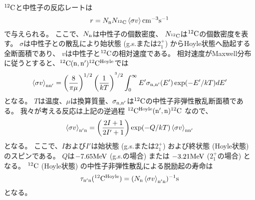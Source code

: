 \documentclass[../master]{subfiles}
\begin{document}
${}^{12}{\rm C}$と中性子の反応レートは
\begin{equation}
  r = N_{\rm n}N_{{}^{12}{\rm C}}\braket{\sigma v} {\rm cm}^{-3}{\rm s}^{-1}
  \label{eq::r}
\end{equation}
で与えられる。
ここで、$N_{{\rm n}}$は中性子の個数密度、
$N_{{}^{12}{\rm C}}$は${}^{12}{\rm C}$の個数密度を表す。
$\sigma$は中性子との散乱により始状態 (g.s.または$2_{1}^{+}$) からHoyle状態へ励起する全断面積であり、
$v$は中性子と${}^{12}{\rm C}$の相対速度である。
相対速度がMaxwell分布に従うとすると、${}^{12}{\rm C}({\rm n},{\rm n'}){}^{12}{\rm C}^{{\rm Hoyle}}$では
\begin{equation}
  \braket{\sigma v}_{\rm nn'} =
  \left(\frac{8}{\pi\mu}\right)^{1/2}\left(\frac{1}{kT}\right)^{^3/2}
  \int^{\infty}_{0}E'\sigma_{\rm n,n'}(E')\exp(-E'/kT)dE'
  \label{eq::sigmann'}
\end{equation}
となる。
$T$は温度、$\mu$は換算質量、$\sigma_{\rm n,n'}$は${}^{12}{\rm C}$の中性子非弾性散乱断面積である。
我々が考える反応は上記の逆過程 ${}^{12}{\rm C}^{{\rm Hoyle}}({\rm n',n}){}^{12}{\rm C}$ なので、
\begin{equation}
  \braket{\sigma v}_{\rm n'n} = \left(\frac{2I+1}{2I'+1}\right)
  \exp(-Q/kT)\braket{\sigma v}_{\rm nn'}
  \label{eq::sigman'n}
\end{equation}
となる。
ここで、$I$および$I'$は始状態 (g.s.または$2_{1}^{+}$)
および終状態 (Hoyle状態) のスピンである。
$Q$は$-7.65{\rm MeV}$ (g.s.の場合) または
$-3.21{\rm MeV}$ ($2_{1}^{+}$の場合) となる。
${}^{12}{\rm C}$ (Hoyle状態) の中性子非弾性散乱による脱励起の寿命は
\begin{equation}
  \tau_{\rm n'n}({}^{12}{\rm C}^{{\rm Hoyle}}) =
  (N_{\rm n}\braket{\sigma v}_{\rm n'n})^{-1} {\rm s}
  \label{eq::tau}
\end{equation}
となる。
\end{document}
